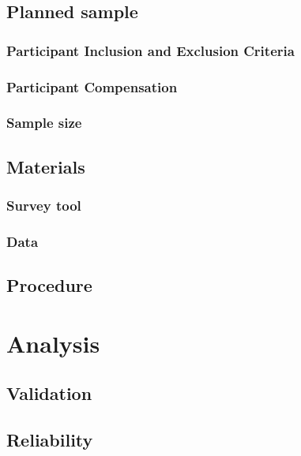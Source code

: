\subsection{Planned sample}
\subsubsection{Participant Inclusion and Exclusion Criteria}
\subsubsection{Participant Compensation}
\subsubsection{Sample size}

\subsection{Materials}
\subsubsection{Survey tool}
\subsubsection{Data}

\subsection{Procedure}

\section{Analysis}
\subsection{Validation}
\subsection{Reliability}


